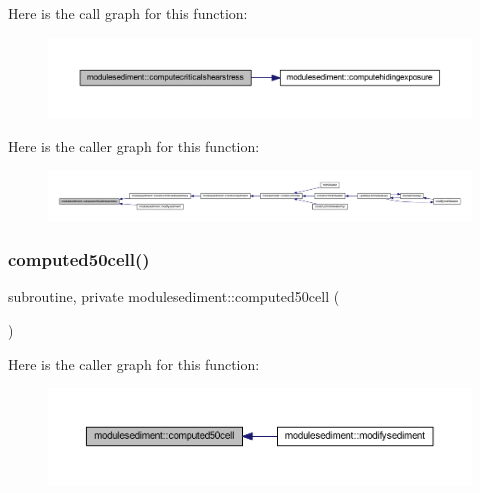 Here is the call graph for this function\+:\nopagebreak
\begin{figure}[H]
\begin{center}
\leavevmode
\includegraphics[width=350pt]{namespacemodulesediment_a04e890023555f00803b6373c6f8934cc_cgraph}
\end{center}
\end{figure}
Here is the caller graph for this function\+:\nopagebreak
\begin{figure}[H]
\begin{center}
\leavevmode
\includegraphics[width=350pt]{namespacemodulesediment_a04e890023555f00803b6373c6f8934cc_icgraph}
\end{center}
\end{figure}
\mbox{\label{namespacemodulesediment_ad32ebe12f24cd2680e47efaeaf5c8e56}} 
\subsubsection{\texorpdfstring{computed50cell()}{computed50cell()}}
{\footnotesize\ttfamily subroutine, private modulesediment\+::computed50cell (\begin{DoxyParamCaption}{ }\end{DoxyParamCaption})\hspace{0.3cm}{\ttfamily [private]}}

Here is the caller graph for this function\+:\nopagebreak
\begin{figure}[H]
\begin{center}
\leavevmode
\includegraphics[width=350pt]{namespacemodulesediment_ad32ebe12f24cd2680e47efaeaf5c8e56_icgraph}
\end{center}
\end{figure}
\mbox{\label{namespacemodulesediment_a299a31086ad8f844252db856c26e1ce7}} 
